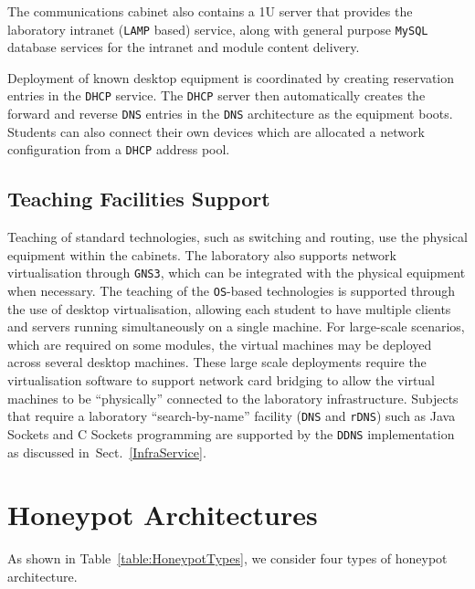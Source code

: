 \documentclass[10pt,journal]{IEEEtran}
\begin{document}
The communications cabinet also contains a 1U server that provides the
laboratory intranet (\texttt{LAMP} based) service, along with general purpose
\texttt{MySQL} database services for the intranet and module content delivery.

Deployment of known desktop equipment is coordinated by creating reservation
entries in the \texttt{DHCP} service. The \texttt{DHCP} server then
automatically creates the forward and reverse \texttt{DNS} entries in the
\texttt{DNS} architecture as the equipment boots. Students can also connect
their own devices which are allocated a network configuration from a
\texttt{DHCP} address pool.

\subsection{Teaching Facilities Support}

Teaching of standard technologies, such as switching and routing, use the
physical equipment within the cabinets. The laboratory also supports network
virtualisation through \texttt{GNS3}, which can be integrated with the physical
equipment when necessary. The teaching of the \texttt{OS}-based technologies is
supported through the use of desktop virtualisation, allowing each student to
have multiple clients and servers running simultaneously on a single machine.
For large-scale scenarios, which are required on some modules, the virtual
machines may be deployed across several desktop machines. These large scale
deployments require the virtualisation software to support network card
bridging to allow the virtual machines to be ``physically'' connected to the
laboratory infrastructure.  Subjects that require a laboratory
``search-by-name'' facility (\texttt{DNS} and \texttt{rDNS}) such as Java
Sockets and C Sockets programming are supported by the \texttt{DDNS}
implementation as discussed in~Sect.~\ref{InfraService}.

\section{Honeypot Architectures}\label{sec:HoneyArch}

As shown in Table~\ref{table:HoneypotTypes}, we consider four types 
of honeypot architecture.
\end{document}
